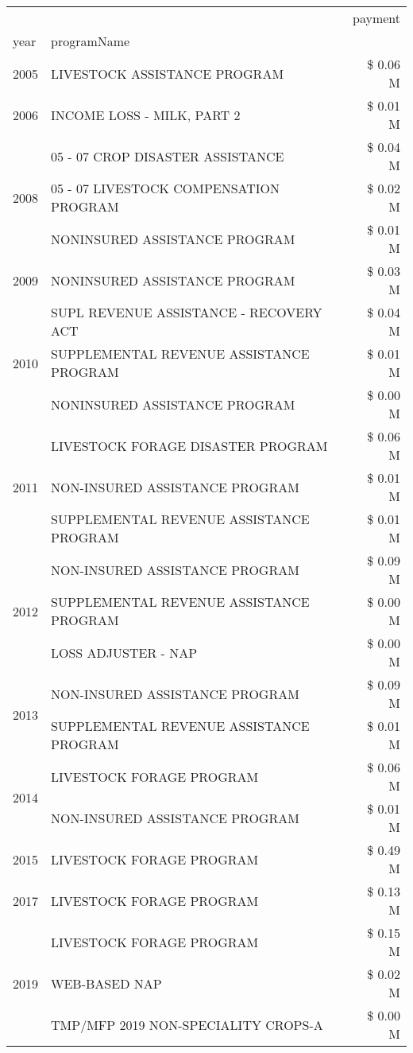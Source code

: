 \begin{tabular}{llr}
\toprule
 &  & payment \\
year & programName &  \\
\midrule
2005 & LIVESTOCK ASSISTANCE PROGRAM & \$ 0.06 M \\
\cline{1-3}
2006 & INCOME LOSS - MILK, PART 2 & \$ 0.01 M \\
\cline{1-3}
\multirow[t]{3}{*}{2008} & 05 - 07 CROP DISASTER ASSISTANCE & \$ 0.04 M \\
 & 05 - 07 LIVESTOCK COMPENSATION PROGRAM & \$ 0.02 M \\
 & NONINSURED ASSISTANCE PROGRAM & \$ 0.01 M \\
\cline{1-3}
2009 & NONINSURED ASSISTANCE PROGRAM & \$ 0.03 M \\
\cline{1-3}
\multirow[t]{3}{*}{2010} & SUPL REVENUE ASSISTANCE - RECOVERY ACT & \$ 0.04 M \\
 & SUPPLEMENTAL REVENUE ASSISTANCE PROGRAM & \$ 0.01 M \\
 & NONINSURED ASSISTANCE PROGRAM & \$ 0.00 M \\
\cline{1-3}
\multirow[t]{3}{*}{2011} & LIVESTOCK FORAGE DISASTER PROGRAM & \$ 0.06 M \\
 & NON-INSURED ASSISTANCE PROGRAM & \$ 0.01 M \\
 & SUPPLEMENTAL REVENUE ASSISTANCE PROGRAM & \$ 0.01 M \\
\cline{1-3}
\multirow[t]{3}{*}{2012} & NON-INSURED ASSISTANCE PROGRAM & \$ 0.09 M \\
 & SUPPLEMENTAL REVENUE ASSISTANCE PROGRAM & \$ 0.00 M \\
 & LOSS ADJUSTER - NAP & \$ 0.00 M \\
\cline{1-3}
\multirow[t]{2}{*}{2013} & NON-INSURED ASSISTANCE PROGRAM & \$ 0.09 M \\
 & SUPPLEMENTAL REVENUE ASSISTANCE PROGRAM & \$ 0.01 M \\
\cline{1-3}
\multirow[t]{2}{*}{2014} & LIVESTOCK FORAGE PROGRAM & \$ 0.06 M \\
 & NON-INSURED ASSISTANCE PROGRAM & \$ 0.01 M \\
\cline{1-3}
2015 & LIVESTOCK FORAGE PROGRAM & \$ 0.49 M \\
\cline{1-3}
2017 & LIVESTOCK FORAGE PROGRAM & \$ 0.13 M \\
\cline{1-3}
\multirow[t]{3}{*}{2019} & LIVESTOCK FORAGE PROGRAM & \$ 0.15 M \\
 & WEB-BASED NAP & \$ 0.02 M \\
 & TMP/MFP 2019 NON-SPECIALITY CROPS-A & \$ 0.00 M \\

\end{tabular}
